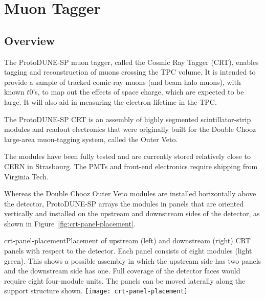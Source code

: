 

\section{Muon Tagger}
\label{sec:beam:muontagger}

\subsection{Overview}

The ProtoDUNE-SP muon tagger, called the Cosmic Ray Tagger (CRT), enables tagging and reconstruction of muons crossing the TPC volume. It is intended to provide a sample of tracked comic-ray muons (and beam halo muons), with known $t0$'s, to map out the effects of space charge, which are expected to be large. It will also aid in measuring the electron lifetime in the TPC.

The ProtoDUNE-SP CRT is an assembly of highly segmented scintillator-strip modules and readout electronics that were originally built for the Double Chooz large-area muon-tagging system, called the Outer Veto.  
 
The modules have been fully tested %
and are currently stored relatively close to CERN in Strasbourg. The PMTs and front-end electronics %
require shipping from %
Virginia Tech.

Whereas the Double Chooz Outer Veto modules are installed horizontally above the detector, ProtoDUNE-SP arrays the modules in panels that are oriented vertically and installed on the upstream and downstream sides of the detector, as shown in Figure~\ref{fig:crt-panel-placement}. 

\begin{cdrfigure}{crt-panel-placement}{Placement of upstream (left) and downstream (right) CRT panels with respect to the detector. Each panel consists of eight modules  (light green). This shows a possible assembly in which the upstream side has two panels and the downstream side has one. Full coverage of the detector faces would require eight four-module units. The panels can be moved laterally along the support structure shown.}
  \texttt{[image: crt-panel-placement]}
\end{cdrfigure}


